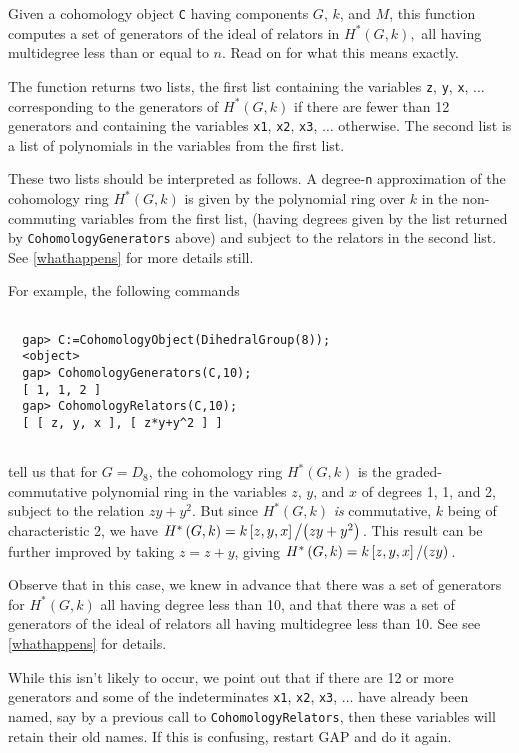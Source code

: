 \documentclass[11pt]{report}
\begin{document}
{{{ Given a cohomology object \texttt{C} having components $G$, $k$, and $M$, this function computes a set of generators of the ideal of relators in  $H^\ast\left(G,k\right),$  all having multidegree less than or equal to $n$. Read on for what this means exactly. 

The function returns two lists, the first list containing the variables \texttt{z}, \texttt{y}, \texttt{x}, $\ldots$ corresponding to the generators of  $H^\ast\left(G,k\right)$  if there are fewer than 12 generators and containing the variables \texttt{x{\textunderscore}1}, \texttt{x{\textunderscore}2}, \texttt{x{\textunderscore}3}, $\ldots$ otherwise. The second list is a list of polynomials in the variables from the
first list. 

These two lists should be interpreted as follows. A degree-\texttt{n} approximation of the cohomology ring  $H^\ast\left(G,k\right)$  is given by the polynomial ring over $k$ in the non-commuting variables from the first list, (having degrees given by
the list returned by \texttt{CohomologyGenerators} above) and subject to the relators in the second list. See \ref{whathappens} for more details still. }

 For example, the following commands 
\begin{Verbatim}[fontsize=\small,frame=single,label=Example]
  
  gap> C:=CohomologyObject(DihedralGroup(8));
  <object>
  gap> CohomologyGenerators(C,10);
  [ 1, 1, 2 ]
  gap> CohomologyRelators(C,10);
  [ [ z, y, x ], [ z*y+y^2 ] ]
  
\end{Verbatim}
 tell us that for $G=D_8$, the cohomology ring  $H^\ast\left(G,k\right)$  is the graded-commutative polynomial ring in the variables $z$, $y$, and $x$ of degrees 1, 1, and 2, subject to the relation $zy+y^2$. But since  $H^\ast\left(G,k\right)$  \emph{is} commutative, $k$ being of characteristic 2, we have  $H^\ast\left(G,k\right)=k\left[z,y,x\right] \left/\left(zy+y^2\right)\right.$.  This result can be further improved by taking $z=z+y$, giving  $H^\ast\left(G,k\right)=k\left[z,y,x\right] \left/\left(zy\right)\right.$.  

Observe that in this case, we knew in advance that there was a set of
generators for $H^\ast\left(G,k\right)$  all having degree less than 10, and that there was a set of generators of the
ideal of relators all having multidegree less than 10. See see \ref{whathappens} for details. 

While this isn't likely to occur, we point out that if there are 12 or more
generators and some of the indeterminates \texttt{x{\textunderscore}1}, \texttt{x{\textunderscore}2}, \texttt{x{\textunderscore}3}, $\ldots$ have already been named, say by a previous call to \texttt{CohomologyRelators}, then these variables will retain their old names. If this is confusing,
restart \textsf{GAP} and do it again. }

}
\end{document}
